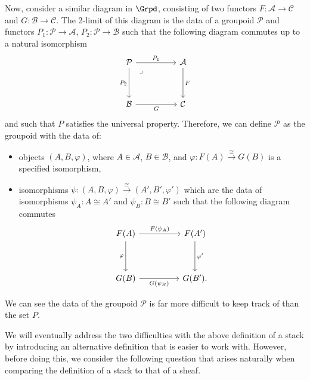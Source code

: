 \begin{example}
    Now, consider a similar diagram in $\Grpd$, consisting of two functors $F: \mathcal{A} \to \mathcal{C}$ and $G: \mathcal{B} \to \mathcal{C}$. The 2-limit of this diagram is the data of a groupoid $\mathcal{P}$ and functors $P_1: \mathcal{P} \to \mathcal{A}$, $P_2: \mathcal{P} \to \mathcal{B}$ such that the following diagram commutes up to a natural isomorphism
    \[\begin{tikzcd}
    	{\mathcal{P}} && {\mathcal{A}} \\
    	\\
    	{\mathcal{B}} && {\mathcal{C}}
    	\arrow[""{name=0, anchor=center, inner sep=0}, "{{P_1}}", from=1-1, to=1-3]
    	\arrow["{{P_2}}"', from=1-1, to=3-1]
    	\arrow["\lrcorner"{anchor=center, pos=0.125}, draw=none, from=1-1, to=3-3]
    	\arrow["F", from=1-3, to=3-3]
    	\arrow[""{name=1, anchor=center, inner sep=0}, "G"', from=3-1, to=3-3]
    \end{tikzcd}\]
    and such that $P$ satisfies the universal property. Therefore, we can define $\mathcal{P}$ as the groupoid with the data of:
    \begin{itemize}
        \item objects $(A, B, \varphi)$, where $A \in \mathcal{A}$, $B \in \mathcal{B}$, and $\varphi: F(A) \xrightarrow{\cong} G(B)$ is a specified isomorphism, 
        \item isomorphisms $\psi: (A, B, \varphi) \xrightarrow{\cong} (A', B', \varphi')$ which are the data of isomorphisms $\psi_A: A \cong A'$ and $\psi_B: B \cong B'$ such that the following diagram commutes
    \[\begin{tikzcd}
    	{F(A)} && {F(A')} \\
    	\\
    	{G(B)} && {G(B').}
    	\arrow["{F(\psi_A)}", from=1-1, to=1-3]
    	\arrow["\varphi"', from=1-1, to=3-1]
    	\arrow["{\varphi'}", from=1-3, to=3-3]
    	\arrow["{G(\psi_B)}"', from=3-1, to=3-3]
    \end{tikzcd}\]
    \end{itemize}
    We can see the data of the groupoid $\mathcal{P}$ is far more difficult to keep track of than the set $P$.
\end{example}

We will eventually address the two difficulties with the above definition of a stack by introducing an alternative definition that is easier to work with. However, before doing this, we consider the following question that arises naturally when comparing the definition of a stack to that of a sheaf.


